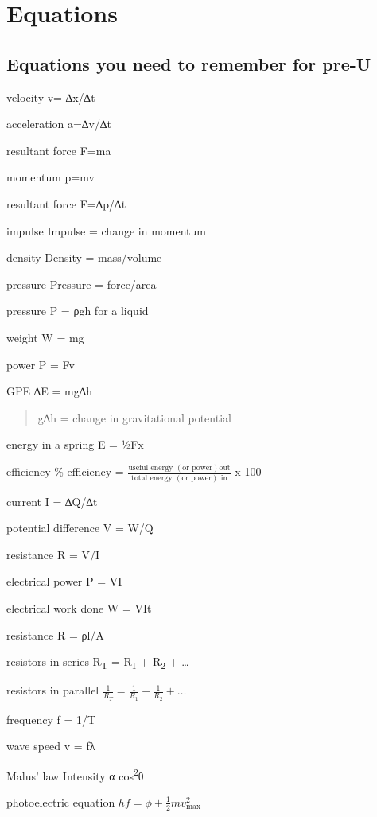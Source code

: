 \documentclass[main.tex]{subfiles}
\begin{document}
\chapter{Equations}

\section{Equations you need to remember for pre-U}

velocity v= ∆x/∆t

acceleration a=∆v/∆t

resultant force F=ma

momentum p=mv

resultant force F=∆p/∆t

impulse Impulse = change in momentum

density Density = mass/volume

pressure Pressure = force/area

pressure P = ρgh for a liquid

weight W = mg

power P = Fv

GPE ∆E = mg∆h

\begin{quote}
g∆h = change in gravitational potential
\end{quote}

energy in a spring E = ½Fx

efficiency \% efficiency =
\(\frac{\text{useful\ energy\ }\left( \text{or\ power} \right)\text{out}}{\text{total\ energy\ }\left( \text{or\ power} \right)\text{\ in}}\)
x 100

current I = ∆Q/∆t

potential difference V = W/Q

resistance R = V/I

electrical power P = VI

electrical work done W = VIt

resistance R = ρl/A

resistors in series R­\textsubscript{T} = R\textsubscript{1} +
R\textsubscript{2} + \ldots{}

resistors in parallel
\(\frac{1}{R_{T}} = \frac{1}{R_{1}} + \frac{1}{R_{2}} + \ldots\)

frequency f = 1/T

wave speed v = fλ

Malus' law Intensity α cos\textsuperscript{2}θ

photoelectric equation \(hf = \phi + \frac{1}{2}mv_{\max}^{2}\)
\end{document}
